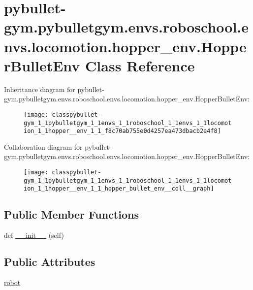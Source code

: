 \hypertarget{classpybullet-gym_1_1pybulletgym_1_1envs_1_1roboschool_1_1envs_1_1locomotion_1_1hopper__env_1_1_hopper_bullet_env}{}\section{pybullet-\/gym.pybulletgym.\+envs.\+roboschool.\+envs.\+locomotion.\+hopper\+\_\+env.\+Hopper\+Bullet\+Env Class Reference}
\label{classpybullet-gym_1_1pybulletgym_1_1envs_1_1roboschool_1_1envs_1_1locomotion_1_1hopper__env_1_1_hopper_bullet_env}


Inheritance diagram for pybullet-\/gym.pybulletgym.\+envs.\+roboschool.\+envs.\+locomotion.\+hopper\+\_\+env.\+Hopper\+Bullet\+Env\+:
\nopagebreak
\begin{figure}[H]
\begin{center}
\leavevmode
\texttt{[image: classpybullet-gym\_1\_1pybulletgym\_1\_1envs\_1\_1roboschool\_1\_1envs\_1\_1locomotion\_1\_1hopper\_\_env\_1\_1\_f8c70ab755e0d4257ea473dbacb2e4f8]}
\end{center}
\end{figure}


Collaboration diagram for pybullet-\/gym.pybulletgym.\+envs.\+roboschool.\+envs.\+locomotion.\+hopper\+\_\+env.\+Hopper\+Bullet\+Env\+:
\nopagebreak
\begin{figure}[H]
\begin{center}
\leavevmode
\texttt{[image: classpybullet-gym\_1\_1pybulletgym\_1\_1envs\_1\_1roboschool\_1\_1envs\_1\_1locomotion\_1\_1hopper\_\_env\_1\_1\_hopper\_bullet\_env\_\_coll\_\_graph]}
\end{center}
\end{figure}
\subsection*{Public Member Functions}
\begin{DoxyCompactItemize}
\item 
def \hyperlink{classpybullet-gym_1_1pybulletgym_1_1envs_1_1roboschool_1_1envs_1_1locomotion_1_1hopper__env_1_1_hopper_bullet_env_a1b62be6d992bad2d7b9b4fc34782100b}{\+\_\+\+\_\+init\+\_\+\+\_\+} (self)
\end{DoxyCompactItemize}
\subsection*{Public Attributes}
\begin{DoxyCompactItemize}
\item 
\hyperlink{classpybullet-gym_1_1pybulletgym_1_1envs_1_1roboschool_1_1envs_1_1locomotion_1_1hopper__env_1_1_hopper_bullet_env_a02d43f8be49c0a2f91b986140876cb48}{robot}
\end{DoxyCompactItemize}


